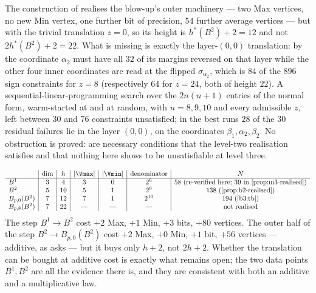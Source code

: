 \begin{remark}\label{b3:gap}
The construction of  realises the blow-up's outer machinery ---
two Max vertices, no new Min vertex, one further bit of precision, $54$ further
average vertices --- but with the trivial translation $z=0$, so its height is
$h^{\ast}(B^{2})+2=12$ and not $2h^{\ast}(B^{2})+2=22$. What is missing is
exactly the layer-$(0,0)$ translation: by  the coordinate
$\alpha_2$ must have all $32$ of its margins reversed on that layer while the
other four inner coordinates are read at the flipped $\sigma_{\alpha_2}$, which
is $84$ of the $896$ sign constraints for $z=8$ (respectively $64$ for $z=24$,
both of height $22$). A sequential-linear-programming search over the
$2n(n+1)$ entries of the normal form, warm-started at  and at
random, with $n=8,9,10$ and every admissible $z$, left between $30$ and $76$
constraints unsatisfied; in the best runs $28$ of the $30$ residual failures
lie in the layer $(0,0)$, on the coordinates $\beta_1,\alpha_2,\beta_2$. No
obstruction is proved:  are necessary conditions that the level-two realisation
satisfies and that nothing here shows to be unsatisfiable at level three.
\end{remark}

\begin{remark}\label{b3:cost}
\[
\begin{array}{l|c|c|c|c|c|c}
 & \dim & h & |\Vmax| & |\Vmin| & \text{denominator} & N\\ \hline
 B^{1} & 3 & 4 & 3 & 0 & 2^{6} & 58\ \text{(re-verified here; $39$ in \Cref{prop:m3-realised})}\\
 B^{2} & 5 & 10 & 5 & 1 & 2^{9} & 138\ \text{(\Cref{prop:b2-realised})}\\
 B_{p,0}(B^{2}) & 7 & 12 & 7 & 1 & 2^{10} & 194\ \text{(\Cref{b3:tb})}\\
 B_{p,8}(B^{2}) & 7 & 22 & \text{---} & \text{---} & \text{---} & \text{not realised}
\end{array}
\]
The step $B^{1}\to B^{2}$ cost $+2$ Max, $+1$ Min, $+3$ bits, $+80$ vertices.
The outer half of the step $B^{2}\to B_{p,0}(B^{2})$ cost $+2$ Max, $+0$ Min,
$+1$ bit, $+56$ vertices --- additive, as  asks --- but
it buys only $h+2$, not $2h+2$. Whether the translation can be bought at
additive cost is exactly what remains open; the two data points $B^{1},B^{2}$
are all the evidence there is, and they are consistent with both an additive
and a multiplicative law.
\end{remark}
